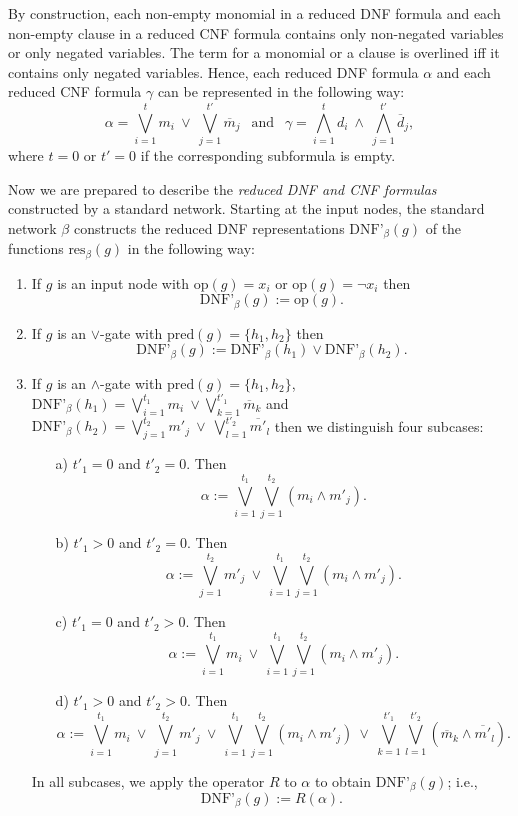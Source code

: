 \documentclass[11pt]{article}
\begin{document}
By construction, each non-empty monomial in a reduced DNF formula and each non-empty clause in a reduced CNF
formula contains only non-negated variables or only negated variables. The term for a monomial or a clause is
overlined iff it contains only negated variables. Hence, each reduced DNF formula $\alpha$ and each reduced
CNF formula $\gamma$ can be represented in the following way:
$$
\alpha = \bigvee_{i=1}^t m_i \: \vee \: \bigvee_{j=1}^{t'} \overline{m}_j \: \: \mbox{ and } \: \:
\gamma = \bigwedge_{i=1}^t d_i \: \wedge \: \bigwedge_{j=1}^{t'} \overline{d}_j,
$$
where $t = 0$ or $t' = 0$ if the corresponding subformula is empty.

Now we are prepared to describe the {\em reduced DNF and CNF formulas\/} constructed by a standard network.
Starting at the input nodes, the standard network $\beta$ constructs the reduced DNF representations
$\mbox{DNF'}_{\beta}(g)$ of the functions $\mbox{res}_{\beta}(g)$ in the following way:
\begin{enumerate}
\item
  If $g$ is an input node with $\mbox{op}(g) = x_i$ or $\mbox{op}(g) = \neg x_i$ then 
  $$\mbox{DNF'}_{\beta}(g) := \mbox{op}(g).$$
\item
  If $g$ is an $\vee$-gate with $\mbox{pred}(g) = \{h_1,h_2\}$ then
  $$
  \mbox{DNF'}_{\beta}(g) := \mbox{DNF'}_{\beta}(h_1) \vee \mbox{DNF'}_{\beta}(h_2).
  $$
\item
  If $g$ is an $\wedge$-gate with $\mbox{pred}(g) = \{h_1,h_2\}$,
  $\mbox{DNF'}_{\beta}(h_1) = \bigvee_{i=1}^{t_1} m_i \: \vee \bigvee_{k=1}^{t'_1} \overline{m}_k$ and
  $\mbox{DNF'}_{\beta}(h_2) = \bigvee_{j=1}^{t_2} m'_j \: \vee \: \bigvee_{l=1}^{t'_2} \overline{m'}_l$ then we
  distinguish four subcases:
  \begin{itemize}
  \item[a)] $t'_1 = 0$ and $t'_2 = 0$.
    Then
    $$
    \alpha := \bigvee_{i=1}^{t_1}\bigvee_{j=1}^{t_2} (m_i \wedge m'_j).
    $$
  \item[b)] $t'_1 > 0$ and $t'_2 = 0$.
    Then
    $$
    \alpha := \bigvee_{j=1}^{t_2} m'_j \: \vee \: \bigvee_{i=1}^{t_1}\bigvee_{j=1}^{t_2} (m_i \wedge m'_j).
    $$
  \item[c)] $t'_1 = 0$ and $t'_2 > 0$.
    Then
    $$
    \alpha := \bigvee_{i=1}^{t_1} m_i \: \vee \: \bigvee_{i=1}^{t_1}\bigvee_{j=1}^{t_2} (m_i \wedge m'_j).
    $$
  \item[d)] $t'_1 > 0$ and $t'_2 > 0$.
    Then
    $$
    \alpha := \bigvee_{i=1}^{t_1} m_i \: \vee \: \bigvee_{j=1}^{t_2} m'_j  \: \vee \: 
    \bigvee_{i=1}^{t_1}\bigvee_{j=1}^{t_2} (m_i \wedge m'_j) \: \vee \:
    \bigvee_{k=1}^{t'_1}\bigvee_{l=1}^{t'_2} (\overline{m}_k \wedge \overline{m'}_l).
    $$
  \end{itemize}
  In all subcases, we apply the operator $R$ to $\alpha$ to obtain $\mbox{DNF'}_{\beta}(g)$; i.e.,
  $$
  \mbox{DNF'}_{\beta}(g) := R(\alpha).
  $$
\end{enumerate}
\end{document}
